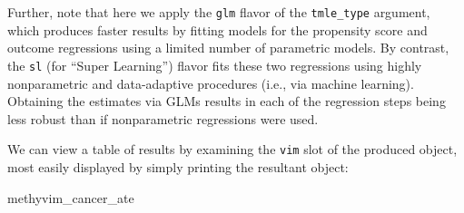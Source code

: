 \documentclass[9pt,a4paper,]{extarticle}
\newenvironment{Shaded}{\begin{snugshade}}{\end{snugshade}}
\newcommand{\NormalTok}[1]{#1}
\theoremstyle{definition}
\theoremstyle{definition}
\theoremstyle{definition}
\theoremstyle{remark}
\begin{document}
Further, note that here we apply the \texttt{glm} flavor of the \texttt{tmle\_type} argument,
which produces faster results by fitting models for the propensity score and
outcome regressions using a limited number of parametric models. By contrast,
the \texttt{sl} (for ``Super Learning'') flavor fits these two regressions using highly
nonparametric and data-adaptive procedures (i.e., via machine learning).
Obtaining the estimates via GLMs results in each of the regression steps
being less robust than if nonparametric regressions were used.

We can view a table of results by examining the \texttt{vim} slot of the produced
object, most easily displayed by simply printing the resultant object:

\begin{Shaded}
\begin{Highlighting}[]
\NormalTok{methyvim_cancer_ate}
\end{Highlighting}
\end{Shaded}
\end{document}
